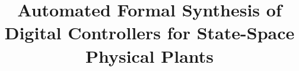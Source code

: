 \documentclass[runningheads,a4paper]{llncs}
\begin{document}
\newcommand\tool{{\sf DSSynth}\xspace}

\mainmatter  %

\title{Automated Formal Synthesis of Digital Controllers for State-Space Physical Plants} 


%
%
%


%
%

\maketitle
\end{document}
